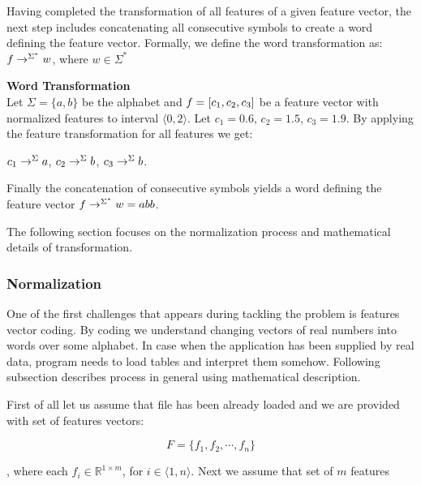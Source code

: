 \documentclass{mini}
\begin{document}
Having completed the transformation of all features of a given feature vector, the next step includes concatenating all consecutive symbols to create a word defining the feature vector. Formally, we define the word transformation as: $f \rightarrow^{\Sigma^{*}} w$, where $w \in \Sigma^*$ 

        
\begin{example} {\bf Word Transformation}\\
    Let $\Sigma =\{a,b\}$ be the alphabet and $f = [c_{1},c_{2},c_{3}]$ be a feature vector with normalized features to interval $\langle 0,2 \rangle$.
    Let $c_{1}=0.6$, $c_{2} = 1.5$, $c_{3} = 1.9$.
    By applying the feature transformation for all features we get:
    \begin{center}
        $c_{1} \rightarrow^{\Sigma} a$,
        $c_{2} \rightarrow^{\Sigma} b$,
        $c_{3} \rightarrow^{\Sigma} b$.
    \end{center}
    Finally the concatenation of consecutive symbols yields a word defining the feature vector $f \rightarrow^{\Sigma^{*}} w = abb$.
\end{example}

The following section focuses on the normalization process and mathematical details of transformation.

\subsubsection{Normalization} \label{sec:lan_theory_word_transf_norm}
One of the first challenges that appears during tackling the problem is features vector coding. By coding we understand changing vectors of real numbers into words over some alphabet. In case when the application has been supplied by real data, program needs to load tables and interpret them somehow. Following subsection describes process in general using mathematical description.

First of all let us assume that file has been already loaded and we are provided with set of features vectors: 

\[ F = \{ f_1 , f_2, \cdots , f_n \} \]

, where each $f_i \in \mathbb{R}^{1 \times m}$, for $i \in \langle 1,n \rangle$.
Next we assume that set of $m$ features 
\end{document}
